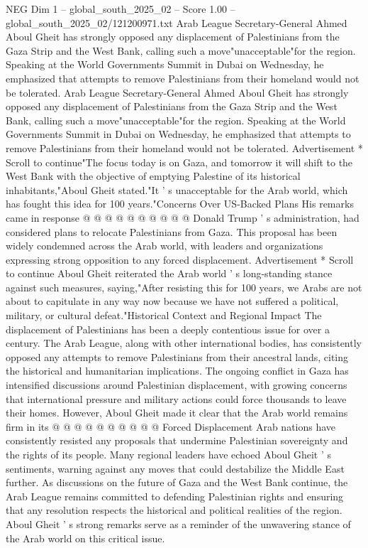 \begin{textsample}{NEG Dim 1 – global\_south\_2025\_02 – Score 1.00 – global\_south\_2025\_02/121200971.txt}  \label{ex:f1_neg_032}
Arab League Secretary-General Ahmed Aboul Gheit has strongly opposed any displacement of Palestinians from the Gaza Strip and the West Bank, calling such a move"unacceptable"for the region.
Speaking at the World Governments Summit in Dubai on Wednesday, he emphasized that attempts to remove Palestinians from their homeland would not be tolerated.
Arab League Secretary-General Ahmed Aboul Gheit has strongly opposed any displacement of Palestinians from the Gaza Strip and the West Bank, calling such a move"unacceptable"for the region.
Speaking at the World Governments Summit in Dubai on Wednesday, he emphasized that attempts to remove Palestinians from their homeland would not be tolerated.
Advertisement * Scroll to continue"The focus today is on Gaza, and tomorrow it will shift to the West Bank with the objective of emptying Palestine of its historical inhabitants,"Aboul Gheit stated."It ' s unacceptable for the Arab world, which has fought this idea for 100 years."Concerns Over US-Backed Plans His remarks came in response @ @ @ @ @ @ @ @ @ @ Donald Trump ' s administration, had considered plans to relocate Palestinians from Gaza.
This proposal has been widely condemned across the Arab world, with leaders and organizations expressing strong opposition to any forced displacement.
Advertisement * Scroll to continue Aboul Gheit reiterated the Arab world ' s long-standing stance against such measures, saying,"After resisting this for 100 years, we Arabs are not about to capitulate in any way now because we have not suffered a political, military, or cultural defeat."Historical Context and Regional Impact The displacement of Palestinians has been a deeply contentious issue for over a century.
The Arab League, along with other international bodies, has consistently opposed any attempts to remove Palestinians from their ancestral lands, citing the historical and humanitarian implications.
The ongoing conflict in Gaza has intensified discussions around Palestinian displacement, with growing concerns that international pressure and military actions could force thousands to leave their homes.
However, Aboul Gheit made it clear that the Arab world remains firm in its @ @ @ @ @ @ @ @ @ @ Forced Displacement Arab nations have consistently resisted any proposals that undermine Palestinian sovereignty and the rights of its people.
Many regional leaders have echoed Aboul Gheit ' s sentiments, warning against any moves that could destabilize the Middle East further.
As discussions on the future of Gaza and the West Bank continue, the Arab League remains committed to defending Palestinian rights and ensuring that any resolution respects the historical and political realities of the region.
Aboul Gheit ' s strong remarks serve as a reminder of the unwavering stance of the Arab world on this critical issue.

\end{textsample}

